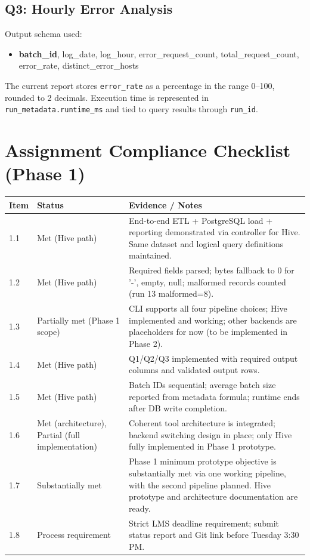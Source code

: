 \documentclass[12pt,a4paper]{article}
\begin{document}
\subsection{Q3: Hourly Error Analysis}
Output schema used:
\begin{itemize}
    \item \textbf{batch\_id}, log\_date, log\_hour, error\_request\_count, total\_request\_count, error\_rate, distinct\_error\_hosts
\end{itemize}
The current report stores \texttt{error\_rate} as a percentage in the range 0--100, rounded to 2 decimals.
Execution time is represented in \texttt{run\_metadata.runtime\_ms} and tied to query results through \texttt{run\_id}.

\section{Assignment Compliance Checklist (Phase 1)}
\begin{longtable}{p{}p{}p{}}
\toprule
\textbf{Item} & \textbf{Status} & \textbf{Evidence / Notes} \\
\midrule
1.1 & Met (Hive path) & End-to-end ETL + PostgreSQL load + reporting demonstrated via controller for Hive. Same dataset and logical query definitions maintained. \\
1.2 & Met (Hive path) & Required fields parsed; bytes fallback to 0 for '-', empty, null; malformed records counted (run 13 malformed=8). \\
1.3 & Partially met (Phase 1 scope) & CLI supports all four pipeline choices; Hive implemented and working; other backends are placeholders for now (to be implemented in Phase 2). \\
1.4 & Met (Hive path) & Q1/Q2/Q3 implemented with required output columns and validated output rows. \\
1.5 & Met (Hive path) & Batch IDs sequential; average batch size reported from metadata formula; runtime ends after DB write completion. \\
1.6 & Met (architecture), Partial (full implementation) & Coherent tool architecture is integrated; backend switching design in place; only Hive fully implemented in Phase 1 prototype. \\
1.7 & Substantially met & Phase 1 minimum prototype objective is substantially met via one working pipeline, with the second pipeline planned. Hive prototype and architecture documentation are ready. \\
1.8 & Process requirement & Strict LMS deadline requirement; submit status report and Git link before Tuesday 3:30 PM. \\
\bottomrule
\end{longtable}
\end{document}
